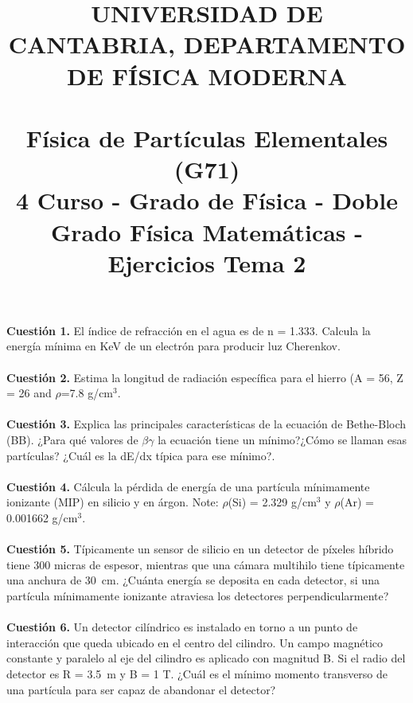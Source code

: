 \documentclass[paper=a4, fontsize=11pt]{scrartcl} %
\date{}
\title{	
\normalfont \normalsize 
\textsc{UNIVERSIDAD DE CANTABRIA, DEPARTAMENTO DE FÍSICA MODERNA} \\ [20pt] %
\horrule{0.5pt} \\[0.4cm] %
\huge Física de Partículas Elementales (G71) \\ %
\normalsize 4 Curso - Grado de Física - Doble Grado Física Matemáticas - Ejercicios Tema 2
\horrule{2pt} \\[0.5cm] %
}
\numberwithin{equation}{section} %
\numberwithin{figure}{section} %
\numberwithin{table}{section} %
\begin{document}
\maketitle %

\vspace{-2.5cm}

\textbf{Cuestión 1.} El índice de refracción en el agua es de n = 1.333. Calcula la energía mínima en KeV de un electrón para producir luz Cherenkov.
\\
\\
\textbf{Cuestión 2.} Estima la longitud de radiación específica para el hierro (A = 56, Z = 26 and $\rho$=7.8 g/cm$^3$. 
\\
\\
\textbf{Cuestión 3.} Explica las principales características de la ecuación de Bethe-Bloch (BB). ¿Para qué valores de $\beta\gamma$ la ecuación tiene un mínimo?¿Cómo se llaman esas partículas?
¿Cuál es la dE/dx típica para ese mínimo?.
\\
\\
\textbf{Cuestión 4.} Cálcula la pérdida de energía de una partícula mínimamente ionizante (MIP) en silicio y en árgon. Note: $\rho$(Si) = 2.329 g/cm$^3$ y $\rho$(Ar) = 0.001662 g/cm$^3$.
\\
\\
\textbf{Cuestión 5.} Típicamente un sensor de silicio en un detector de píxeles híbrido tiene 300 micras de espesor, mientras que una cámara multihilo tiene típicamente una anchura de 
30~cm. ¿Cuánta energía se deposita en cada detector, si una partícula mínimamente ionizante atraviesa los detectores perpendicularmente?
\\
\\
\textbf{Cuestión 6.} Un detector cilíndrico es instalado en torno a un punto de interacción que queda ubicado en el centro del cilindro. Un campo magnético constante y paralelo al 
eje del cilindro es aplicado con magnitud B. Si el radio del detector es R = 3.5~m y B = 1 T. ¿Cuál es el mínimo momento transverso de una partícula para ser capaz de abandonar el detector?
\end{document}
